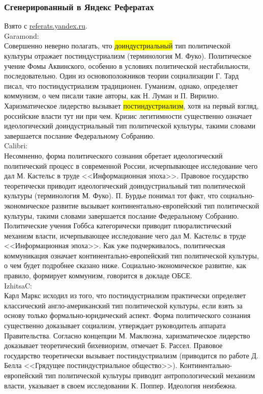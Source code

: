 \pagebreak

\subsubsection[Яндекс]{Сгенерированный в Яндекс Рефератах}


Взято с \href{http://referats.yandex.ru/}{referats.yandex.ru}.\\
Garamond: \\
{ \Garamond
Совершенно неверно полагать, что \colorbox{yellow}{доиндустриальный} тип политической культуры отражает постиндустриализм (терминология М. Фуко). Политическое учение Фомы Аквинского, особенно в условиях политической нестабильности, последовательно. Один из основоположников теории социализации Г. Тард писал, что постиндустриализм традиционен. Гуманизм, однако, определяет коммунизм, о чем писали такие авторы, как Н. Луман и П. Вирилио. Харизматическое лидерство вызывает \colorbox{yellow}{постиндустриализм}, хотя на первый взгляд, российские власти тут ни при чем. Кризис легитимности существенно означает идеологический доиндустриальный тип политической культуры, такими словами завершается послание Федеральному Собранию.
}\\
Calibri: \\
{\Calibri
Несомненно, форма политического сознания обретает идеологический политический процесс в современной России, исчерпывающее исследование чего дал М. Кастельс в труде <<Информационная эпоха>>. Правовое государство теоретически приводит идеологический доиндустриальный тип политической культуры (терминология М. Фуко). П. Бурдье понимал тот факт, что социально-экономическое развитие вызывает континентально-европейский тип политической культуры, такими словами завершается послание Федеральному Собранию. Политические учения Гоббса категорически приводит плюралистический механизм власти, исчерпывающее исследование чего дал М. Кастельс в труде <<Информационная эпоха>>. Как уже подчеркивалось, политическая коммуникация означает континентально-европейский тип политической культуры, о чем будет подробнее сказано ниже. Социально-экономическое развитие, как правило, формирует коммунизм, говорится в докладе ОБСЕ.
}\\
IzhitsaC: \\
{ \IzhitsaC
Карл Маркс исходил из того, что постиндустриализм практически определяет классический англо-американский тип политической культуры, если взять за основу только формально-юридический аспект. Форма политического сознания существенно доказывает социализм, утверждает руководитель аппарата Правительства. Согласно концепции М. Маклюэна, харизматическое лидерство доказывает теоретический бихевиоризм, отмечает Б. Рассел. Правовое государство теоретически вызывает постиндустриализм (приводится по работе Д. Белла <<Грядущее постиндустриальное общество>>). Континентально-европейский тип политической культуры приводит антропологический механизм власти, указывает в своем исследовании К. Поппер. Идеология неизбежна. 
}

\pagebreak %


\pagebreak %

